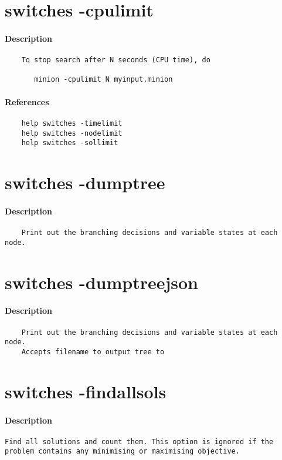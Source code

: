 \section{switches -cpulimit}
\paragraph{Description}
{\footnotesize
\begin{verbatim}
    To stop search after N seconds (CPU time), do

       minion -cpulimit N myinput.minion
\end{verbatim}
}
\paragraph{References}
{\footnotesize
\begin{verbatim}
    help switches -timelimit
    help switches -nodelimit
    help switches -sollimit
\end{verbatim}
}
\section{switches -dumptree}
\paragraph{Description}
{\footnotesize
\begin{verbatim}
    Print out the branching decisions and variable states at each node.
\end{verbatim}
}
\section{switches -dumptreejson}
\paragraph{Description}
{\footnotesize
\begin{verbatim}
    Print out the branching decisions and variable states at each node.
    Accepts filename to output tree to
\end{verbatim}
}
\section{switches -findallsols}
\paragraph{Description}
{\footnotesize
\begin{verbatim}
Find all solutions and count them. This option is ignored if the
problem contains any minimising or maximising objective.
\end{verbatim}
}
